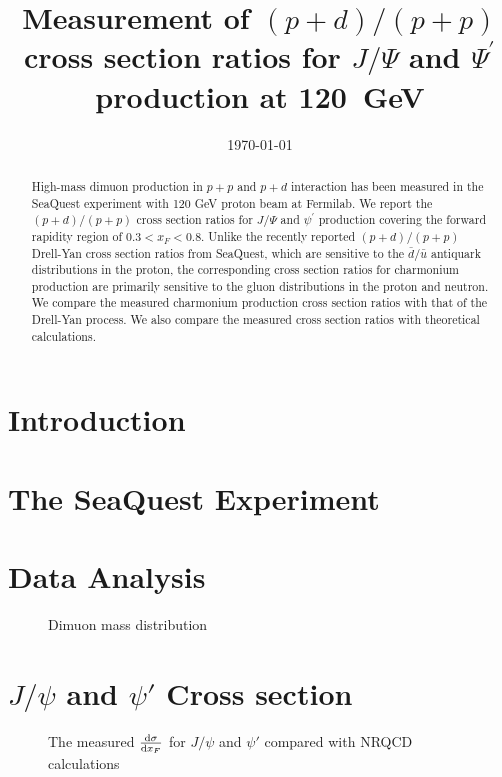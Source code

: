 \documentclass[twocolumn,aps,unsortedaddress,superscriptaddress,prd,floatfix,showpacs,linenumbers]{revtex4-2}
\begin{document}
\title{Measurement of $(p+d) / (p+p)$ cross section ratios for
$J/\Psi$ and $\Psi^\prime$ production at \SI{120}{\GeV}}


\date{\today}
\begin{abstract}
High-mass dimuon production in $p+p$ and $p+d$ interaction has been measured
in the SeaQuest experiment with 120 GeV proton beam at Fermilab.
We report the $(p+d) / (p+p)$ cross section
ratios for $J/\Psi$ and $\psi^\prime$ production covering the forward
rapidity region of $0.3 < x_F <0.8$. Unlike the recently reported
$(p+d) / (p+p)$ Drell-Yan cross section ratios from SeaQuest, which are
sensitive to the
$\bar d / \bar u$ antiquark distributions in the proton, the corresponding
cross section ratios for charmonium production are primarily
sensitive to the gluon
distributions in the proton and neutron. We compare the measured
charmonium production cross section ratios with that of the
Drell-Yan process. We also compare the measured cross section ratios with
theoretical calculations.

\end{abstract}


\maketitle
\section{Introduction}

\section{The SeaQuest Experiment}

\section{Data Analysis}
\begin{figure}
\caption{Dimuon mass distribution }
\label{fig:massfit}
\end{figure}

\section{$J/\psi$ and $\psi'$ Cross section}
\begin{figure}
\caption{The measured $\dv{\sigma}{x_F}$ for $J/\psi$ and $\psi'$ compared with NRQCD calculations}
\label{fig:xF_cross_sections}
\end{figure}
\end{document}
